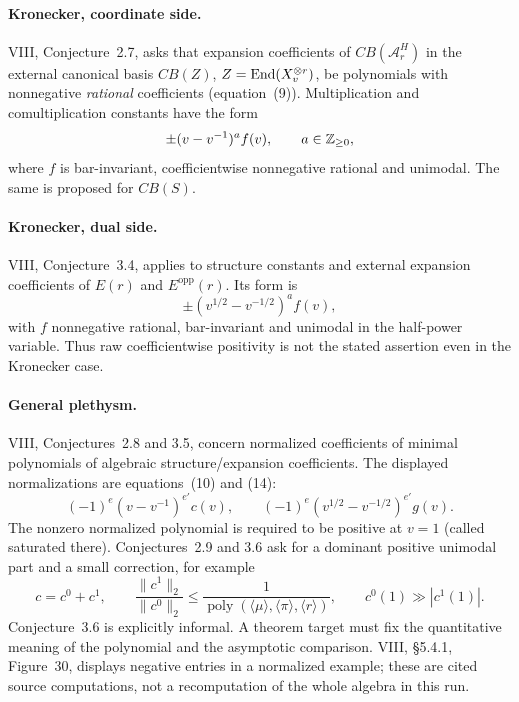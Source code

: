 \documentclass[11pt,a4paper]{article}
\theoremstyle{named}\newtheorem{finding}{Finding}[section]
\theoremstyle{definition}\newtheorem{definition}[finding]{Definition}
\theoremstyle{remark}\newtheorem{remark}[finding]{Remark}
\begin{document}
\paragraph{Kronecker, coordinate side.}
VIII, Conjecture~2.7, asks that expansion coefficients of $CB(\mathcal A_r^H)$ in the external canonical basis $CB(Z)$, $Z=\operatorname{End}(X_v^{\otimes r})$, be polynomials with nonnegative \emph{rational} coefficients (equation~(9)). Multiplication and comultiplication constants have the form
\begin{equation}\label{eq:kroneckerpositive}
 \pm(v-v^{-1})^a f(v),\qquad a\in\mathbb Z_{\ge0},
\end{equation}
where $f$ is bar-invariant, coefficientwise nonnegative rational and unimodal. The same is proposed for $CB(S)$.

\paragraph{Kronecker, dual side.}
VIII, Conjecture~3.4, applies to structure constants and external expansion coefficients of $E(r)$ and $E^{\mathrm{opp}}(r)$. Its form is
\begin{equation}\label{eq:dualpositive}
 \pm(v^{1/2}-v^{-1/2})^a f(v),
\end{equation}
with $f$ nonnegative rational, bar-invariant and unimodal in the half-power variable. Thus raw coefficientwise positivity is not the stated assertion even in the Kronecker case.

\paragraph{General plethysm.}
VIII, Conjectures~2.8 and 3.5, concern normalized coefficients of minimal polynomials of algebraic structure/expansion coefficients. The displayed normalizations are equations~(10) and (14):
\[
 (-1)^e(v-v^{-1})^{e'}c(v),\qquad
 (-1)^e(v^{1/2}-v^{-1/2})^{e'}g(v).
\]
The nonzero normalized polynomial is required to be positive at $v=1$ (called saturated there). Conjectures~2.9 and 3.6 ask for a dominant positive unimodal part and a small correction, for example
\[
 c=c^0+c^1,\qquad
 \frac{\|c^1\|_2}{\|c^0\|_2}
 \le\frac1{\operatorname{poly}(\langle\mu\rangle,\langle\pi\rangle,\langle r\rangle)},
 \qquad c^0(1)\gg |c^1(1)|.
\]
Conjecture~3.6 is explicitly informal. A theorem target must fix the quantitative meaning of the polynomial and the asymptotic comparison. VIII, \S5.4.1, Figure~30, displays negative entries in a normalized example; these are cited source computations, not a recomputation of the whole algebra in this run.
\end{document}
